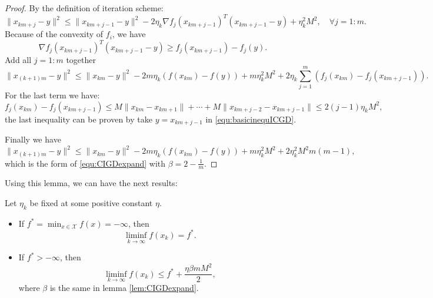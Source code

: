 \begin{proof}
	By the definition of iteration scheme:
	\begin{equation}\label{equ:basicinequICGD}
	\|x_{km+j} - y\|^2 \le \|x_{km+j-1} - y\|^2 -2\eta_k \nabla f_{j}(x_{km+j-1})^{T}(x_{km+j-1}-y) + \eta_k^2 M^2, \quad \forall j = 1:m.
	\end{equation}
	Because of the convexity of $f_i$, we have
	\begin{equation}
	\nabla f_{j}(x_{km+j-1})^{T}(x_{km+j-1}-y) \ge f_{j}(x_{km+j-1}) - f_{j}(y).
	\end{equation}
	Add all $j = 1:m$ together
	\begin{equation}
	\|x_{(k+1)m} - y\|^2 \le \|x_{km} - y\|^2 -2m\eta_k (f(x_{km}) - f(y))+ m\eta_k^2 M^2 + 2\eta_k\sum_{j=1}^m(f_{j}(x_{km}) - f_{j}(x_{km+j-1}) ).
	\end{equation}
	For the last term we have:
	\begin{equation}
	f_{j}(x_{km}) - f_{j}(x_{km+j-1}) \le M\| x_{km} - x_{km + 1} \| + \cdots + M\|x_{km+j-2} - x_{km+j-1}\| \le 2(j-1)\eta_k M^2,
	\end{equation}
	the last inequality can be proven by take $y = x_{km + j -1}$ in \ref{equ:basicinequICGD}.
	
	Finally we have
	\begin{equation}
	\|x_{(k+1)m} - y\|^2 \le \|x_{km} - y\|^2 -2m\eta_k (f(x_{km}) - f(y))+ m\eta_k^2 M^2 + 2\eta_k^2 M^2m(m-1),
	\end{equation}
	which is the form of \ref{equ:CIGDexpand} with $\beta = 2 - \frac{1}{m}$.
\end{proof}

Using this lemma, we can have the next results:
\begin{theorem}
	Let $\eta_k$ be fixed at some positive constant $\eta$.
	\begin{itemize}
		\item If $ f^* = \min_{x \in \mathcal{X}}f(x) = -\infty$, then
		\begin{equation}
		\mathop{\lim\inf}_{k \to \infty} f(x_k) = f^*.
		\end{equation}
		\item If $f^* > -\infty$, then 
		\begin{equation}
		\mathop{\lim\inf}_{k \to \infty} f(x_k) \le f^* + \frac{\eta \beta m M^2}{2},
		\end{equation}
		where $\beta$ is the same in lemma \ref{lem:CIGDexpand}.
	\end{itemize}
\end{theorem}

